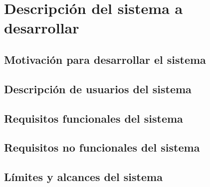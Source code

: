 
\section{Descripción del sistema a desarrollar}

\subsection{Motivación para desarrollar el sistema}

\subsection{Descripción de usuarios del sistema}

\subsection{Requisitos funcionales del sistema}

\subsection{Requisitos no funcionales del sistema}

\subsection{Límites y alcances del sistema}
